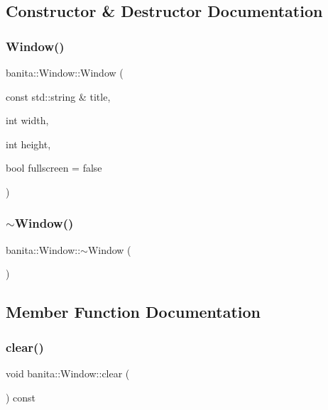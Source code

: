 \subsection{Constructor \& Destructor Documentation}
\mbox{\label{classbanita_1_1_window_ae0a1e293ad0a06d2c76faffb2ea2584a}} 
\subsubsection{\texorpdfstring{Window()}{Window()}}
{\footnotesize\ttfamily banita\+::\+Window\+::\+Window (\begin{DoxyParamCaption}\item[{const std\+::string \&}]{title,  }\item[{int}]{width,  }\item[{int}]{height,  }\item[{bool}]{fullscreen = {\ttfamily false} }\end{DoxyParamCaption})}

\mbox{\label{classbanita_1_1_window_a7dc6f77899cbb641225ef36b1ab2f83a}} 
\subsubsection{\texorpdfstring{$\sim$Window()}{~Window()}}
{\footnotesize\ttfamily banita\+::\+Window\+::$\sim$\+Window (\begin{DoxyParamCaption}{ }\end{DoxyParamCaption})}



\subsection{Member Function Documentation}
\mbox{\label{classbanita_1_1_window_a535e8db0d7c55078fb708dcacf1226e8}} 
\subsubsection{\texorpdfstring{clear()}{clear()}}
{\footnotesize\ttfamily void banita\+::\+Window\+::clear (\begin{DoxyParamCaption}{ }\end{DoxyParamCaption}) const}

